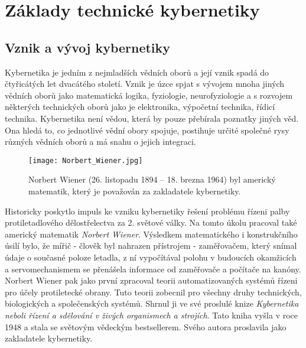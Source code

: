 \chapter{Základy technické kybernetiky}
\minitoc
  \section{Vznik a vývoj kybernetiky}
    Kybernetika je jedním z nejmladších vědních oborů a její vznik spadá do čtyřicátých let 
    dvacátého století. Vznik je úzce spjat s vývojem mnoha jiných vědních oborů jako matematická 
    logika, fyziologie, neurofyziologie a s rozvojem některých technických oborů jako je 
    elektronika, výpočetní technika, řídicí technika. Kybernetika není vědou, která by pouze 
    přebírala poznatky jiných věd. Ona hledá to, co jednotlivé vědní obory spojuje, postihuje 
    určité společné rysy různých vědních oborů a má snahu o jejich integraci. 

    \begin{figure}[ht!]
      \centering
      \texttt{[image: Norbert\_Wiener.jpg]}
      \caption{Norbert Wiener (26. listopadu 1894 – 18. brezna 1964) byl americký matematik, který 
               je považován za zakladatele kybernetiky. }
      \label{tky:fig003}
    \end{figure}
  
    Historicky poskytlo impuls ke vzniku kybernetiky řešení problému řízeni palby protiletadlového 
    dělostřelectva za 2. světové války. Na tomto úkolu pracoval také americký matematik 
    \emph{Norbert Wiener}. Výsledkem matematického i konstrukčního úsilí bylo, že mířič - člověk 
    byl nahrazen přístrojem - zaměřovačem, který snímal údaje o současné poloze letadla, z ní 
    vypočítával polohu v budoucích okamžicích a servomechanismem se přenášela informace od 
    zaměřovače a počítače na kanóny. Norbert Wiener pak jako první zpracoval teorii 
    automatizovaných systémů řízeni pro účely protiletecké obrany. Tuto teorii zobecnil pro všechny 
    druhy technických, biologických a společenských systémů. Shrnul ji ve své proslulé knize 
    \emph{Kybernetika neboli řízení a sdělování v živých organismech a strojích}. Tato kniha vyšla 
    v roce \num{1948} a stala se světovým vědeckým bestsellerem. Svého autora proslavila jako 
    zakladatele kybernetiky.
    
